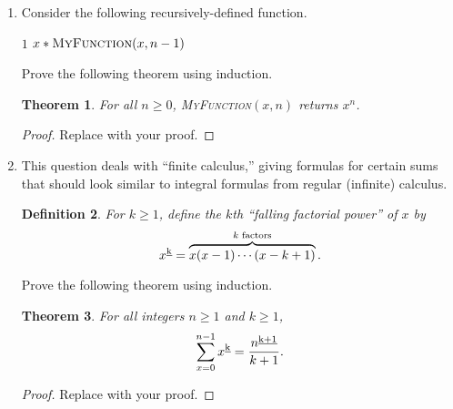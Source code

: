 \documentclass[11pt]{article}
\newtheorem{theorem}{Theorem}
\newtheorem{definition}[theorem]{Definition}
\begin{document}
\begin{enumerate}
  \begin{proof}
    Replace with your proof.
  \end{proof}

\item Consider the following recursively-defined function.
  \begin{algorithmic}
      \State \Return $1$
    \Else
    \State \Return $x * \Call{MyFunction}{x,n-1}$
    \EndIf
    \EndFunction
  \end{algorithmic}
  Prove the following theorem using induction.
  \begin{theorem}
    For all $n\geq 0$, \textsc{MyFunction}$(x,n)$ returns $x^n$.
  \end{theorem}
  
  \begin{proof}
    Replace with your proof.
  \end{proof}
  
\item This question deals with ``finite calculus,'' giving formulas
  for certain sums that should look similar to integral formulas from
  regular (infinite) calculus.
  \newcommand{\falling}[1]{{\underbar{\scriptsize #1}}}
  \begin{definition}
    For $k\geq 1$, define the $k$th ``falling factorial power'' of $x$ by
    \[ x^{\falling{k}} = \overbrace{x(x-1)\cdots (x-k+1)}^{k\text{ factors}} . \]
  \end{definition}

  Prove the following theorem using induction.
  \begin{theorem}
    For all integers $n\geq 1$ and $k\geq 1$,
    \[ \sum_{x=0}^{n-1} x^{\falling{k}} =
    \frac{n^{\falling{k+1}}}{k+1} .\]
  \end{theorem}
  
  \begin{proof}
    Replace with your proof.
  \end{proof}
  
\end{enumerate}
\end{document}
